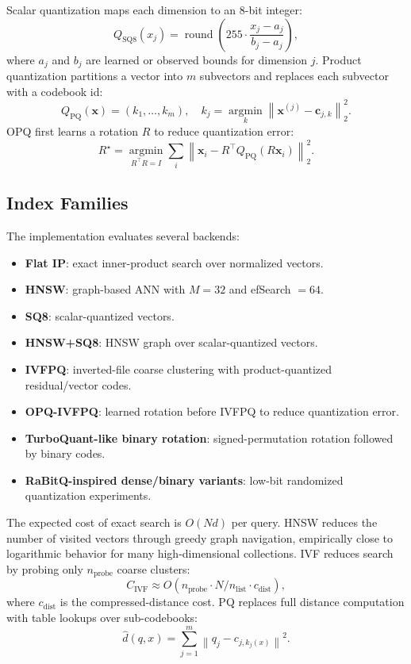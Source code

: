 \documentclass[11pt]{article}
\newcommand{\vect}[1]{\mathbf{#1}}
\begin{document}
Scalar quantization maps each dimension to an 8-bit integer:
\begin{equation}
  Q_{\mathrm{SQ8}}(x_j)=\operatorname{round}\left(255\cdot\frac{x_j-a_j}{b_j-a_j}\right),
\end{equation}
where $a_j$ and $b_j$ are learned or observed bounds for dimension $j$. Product quantization partitions a vector into $m$ subvectors and replaces each subvector with a codebook id:
\begin{equation}
  Q_{\mathrm{PQ}}(\vect{x}) = \left(k_1,\ldots,k_m\right),
  \quad
  k_j=\operatorname*{argmin}_{k}\left\|\vect{x}^{(j)}-\vect{c}_{j,k}\right\|_2^2.
\end{equation}
OPQ first learns a rotation $R$ to reduce quantization error:
\begin{equation}
  R^\star=\operatorname*{argmin}_{R^\top R=I}\sum_i
  \left\|\vect{x}_i - R^\top Q_{\mathrm{PQ}}(R\vect{x}_i)\right\|_2^2.
\end{equation}

\subsection{Index Families}

The implementation evaluates several backends:
\begin{itemize}[leftmargin=*]
  \item \textbf{Flat IP}: exact inner-product search over normalized vectors.
  \item \textbf{HNSW}: graph-based ANN with $M=32$ and efSearch $=64$.
  \item \textbf{SQ8}: scalar-quantized vectors.
  \item \textbf{HNSW+SQ8}: HNSW graph over scalar-quantized vectors.
  \item \textbf{IVFPQ}: inverted-file coarse clustering with product-quantized residual/vector codes.
  \item \textbf{OPQ-IVFPQ}: learned rotation before IVFPQ to reduce quantization error.
  \item \textbf{TurboQuant-like binary rotation}: signed-permutation rotation followed by binary codes.
  \item \textbf{RaBitQ-inspired dense/binary variants}: low-bit randomized quantization experiments.
\end{itemize}

The expected cost of exact search is $O(Nd)$ per query. HNSW reduces the number of visited vectors through greedy graph navigation, empirically close to logarithmic behavior for many high-dimensional collections. IVF reduces search by probing only $n_{\mathrm{probe}}$ coarse clusters:
\begin{equation}
  C_{\mathrm{IVF}}\approx O(n_{\mathrm{probe}}\cdot N/n_{\mathrm{list}}\cdot c_{\mathrm{dist}}),
\end{equation}
where $c_{\mathrm{dist}}$ is the compressed-distance cost. PQ replaces full distance computation with table lookups over sub-codebooks:
\begin{equation}
  \widehat{d}(q,x)=\sum_{j=1}^{m} \left\|q_j - c_{j,k_j(x)}\right\|^2.
\end{equation}
\end{document}
